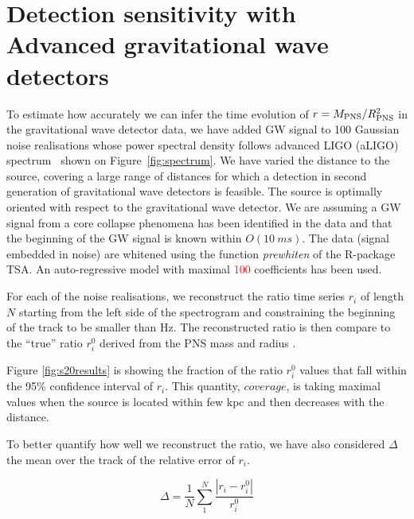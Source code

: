 \section{Detection sensitivity with Advanced gravitational wave detectors}
\label{sec:results}

To estimate how accurately we can infer the time evolution of $r=M_{\rm PNS}/R_{\rm PNS}^2$ in the
gravitational wave detector data, we have added  GW signal  to 
100 Gaussian noise realisations whose power spectral density follows  advanced LIGO (aLIGO)
spectrum~\cite{aLIGOsens:2018} shown on Figure~\ref{fig:spectrum}. 
We have varied the distance to the source, covering a large
range of distances for which a detection in second generation of gravitational wave detectors
is feasible. The source is optimally oriented with
respect to the gravitational wave detector. We are assuming a GW signal from a core collapse
phenomena has been identified in the data and that the beginning of the GW signal is known within $O(10~ms)$.
The data (signal embedded in noise) are whitened using the function {\it prewhiten} of the R-package TSA.
An auto-regressive model with maximal \textcolor{red}{100} coefficients has been used.    

For each of the noise realisations, we reconstruct the ratio time series {$r_i$}
of length $N$ starting from the left side of the spectrogram and constraining the beginning of the
track to be smaller than \unit[200]{Hz}. The reconstructed ratio is then compare to the ``true'' ratio
{$r_i^0$} derived from the PNS mass and radius .

Figure \ref{fig:s20results} is showing the fraction of the ratio {$r_i^0$} values that fall
within the 95\% confidence interval of {$r_i$}. This quantity, $coverage$, is taking maximal values
when the source is located within few kpc and then decreases with the distance.

To better quantify how well we reconstruct the ratio, we have also considered $\Delta$ the mean
over the track of the relative error of $r_i$. 

\begin{equation}
\Delta=\frac{1}{N}\sum_1^N\frac{|r_i-r_i^0|}{r_i^0}
\end{equation}

